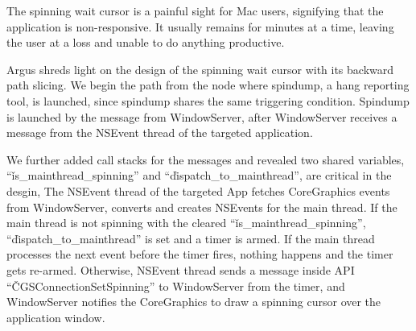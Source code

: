The spinning wait cursor is a painful sight for Mac users, signifying that the
application is non-responsive. It usually remains for minutes at a time, leaving
the user at a loss and unable to do anything productive.

Argus shreds light on the design of the spinning wait cursor with its backward
path slicing. We begin the path from the node where spindump, a hang reporting
tool, is launched, since spindump shares the same triggering condition.
Spindump is launched by the message from WindowServer, after WindowServer
receives a message from the NSEvent thread of the targeted application.

We further added call stacks for the messages and revealed two shared variables,
``\v{is\_mainthread\_spinning}'' and ``\v{dispatch\_to\_mainthread}'', are
critical in the desgin, The NSEvent thread of the targeted App fetches
CoreGraphics events from WindowServer, converts and creates NSEvents for the
main thread. If the main thread is not spinning with the cleared
``\v{is\_mainthread\_spinning}'', ``\v{dispatch\_to\_mainthread}'' is set and
a timer is armed. If the main thread processes the next event before the timer
fires, nothing happens and the timer gets re-armed. Otherwise, NSEvent thread
sends a message inside API ``\v{CGSConnectionSetSpinning}'' to WindowServer from
the timer, and WindowServer notifies the CoreGraphics to draw a spinning cursor
over the application window.
